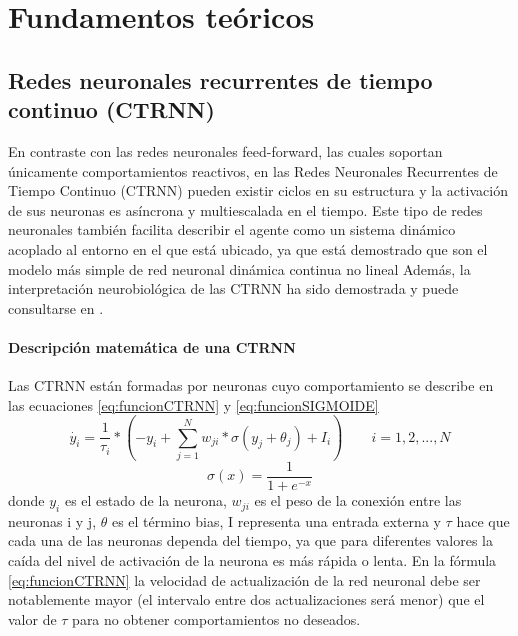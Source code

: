 \chapter{Fundamentos teóricos}

\section{Redes neuronales recurrentes de tiempo continuo (CTRNN)}
En contraste con las redes neuronales feed-forward, las cuales soportan únicamente comportamientos
reactivos, en las Redes Neuronales Recurrentes de Tiempo Continuo (CTRNN) \cite{BeerRD}
pueden existir ciclos en su estructura y la activación de sus neuronas es asíncrona y multiescalada
en el tiempo. Este tipo de redes neuronales también facilita describir el agente como un
sistema dinámico acoplado al entorno en el que está ubicado, ya que está demostrado que son el
modelo más simple de red neuronal dinámica continua no lineal \cite{FunaYNaka}
Además, la interpretación neurobiológica de las CTRNN ha sido demostrada y puede consultarse
en \cite{BeerRD}.

\subsubsection{Descripción matemática de una CTRNN}
Las CTRNN están formadas por neuronas cuyo comportamiento se describe en las ecuaciones \ref{eq:funcionCTRNN} y \ref{eq:funcionSIGMOIDE}
\begin{equation} \label{eq:funcionCTRNN}
	\dot{y_{i}}= \frac{1}{\tau_{i}} * \left ( -y_{i}+\sum_{j=1}^{N}w_{ji}*\sigma \left ( y_{j} + \theta _{j} \right ) + I_{i} \right ) \qquad i =1,2,...,N
\end{equation}
\begin{equation} \label{eq:funcionSIGMOIDE}
	\sigma (x)=\frac{1}{1+e^{-x}}
\end{equation}
donde $y_{i}$ es el estado de la neurona, $w_{ji}$ es el peso de la conexión entre las neuronas i y j,
$\theta$ es el término bias, I representa una entrada externa y $\tau$ hace que cada una de las neuronas
dependa del tiempo, ya que para diferentes valores la caída del nivel de activación de la neurona
es más rápida o lenta. En la fórmula \ref{eq:funcionCTRNN} la velocidad de actualización de la red neuronal debe ser
notablemente mayor (el intervalo entre dos actualizaciones será menor) que el valor de $\tau$ para no
obtener comportamientos no deseados.

